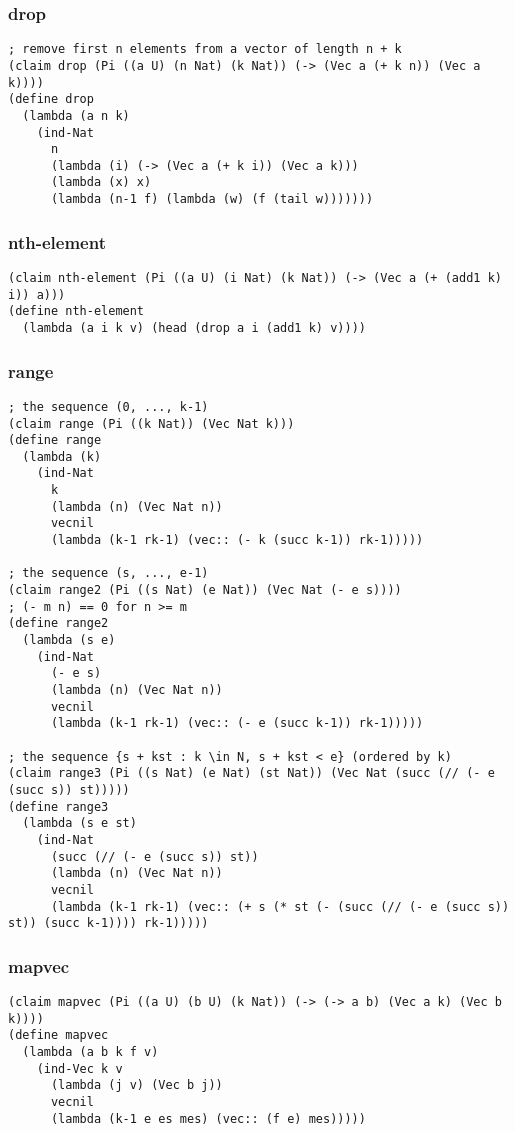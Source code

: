 \subsubsection{drop} \label{code:drop}
\begin{verbatim}
; remove first n elements from a vector of length n + k
(claim drop (Pi ((a U) (n Nat) (k Nat)) (-> (Vec a (+ k n)) (Vec a k))))
(define drop
  (lambda (a n k)
    (ind-Nat
      n
      (lambda (i) (-> (Vec a (+ k i)) (Vec a k)))
      (lambda (x) x)
      (lambda (n-1 f) (lambda (w) (f (tail w)))))))
\end{verbatim}

\subsubsection{nth-element} \label{code:nth-element}
\begin{verbatim}
(claim nth-element (Pi ((a U) (i Nat) (k Nat)) (-> (Vec a (+ (add1 k) i)) a)))
(define nth-element
  (lambda (a i k v) (head (drop a i (add1 k) v))))
\end{verbatim}

\subsubsection{range} \label{code:range}
\begin{verbatim}
; the sequence (0, ..., k-1)
(claim range (Pi ((k Nat)) (Vec Nat k)))
(define range
  (lambda (k)
    (ind-Nat
      k
      (lambda (n) (Vec Nat n))
      vecnil
      (lambda (k-1 rk-1) (vec:: (- k (succ k-1)) rk-1)))))

; the sequence (s, ..., e-1)
(claim range2 (Pi ((s Nat) (e Nat)) (Vec Nat (- e s))))
; (- m n) == 0 for n >= m
(define range2
  (lambda (s e)
    (ind-Nat
      (- e s)
      (lambda (n) (Vec Nat n))
      vecnil
      (lambda (k-1 rk-1) (vec:: (- e (succ k-1)) rk-1)))))

; the sequence {s + kst : k \in N, s + kst < e} (ordered by k)
(claim range3 (Pi ((s Nat) (e Nat) (st Nat)) (Vec Nat (succ (// (- e (succ s)) st)))))
(define range3
  (lambda (s e st)
    (ind-Nat
      (succ (// (- e (succ s)) st))
      (lambda (n) (Vec Nat n))
      vecnil
      (lambda (k-1 rk-1) (vec:: (+ s (* st (- (succ (// (- e (succ s)) st)) (succ k-1)))) rk-1)))))
\end{verbatim}

\subsubsection{mapvec} \label{code:mapvec}
\begin{verbatim}
(claim mapvec (Pi ((a U) (b U) (k Nat)) (-> (-> a b) (Vec a k) (Vec b k))))
(define mapvec
  (lambda (a b k f v)
    (ind-Vec k v
      (lambda (j v) (Vec b j))
      vecnil
      (lambda (k-1 e es mes) (vec:: (f e) mes)))))
\end{verbatim}

